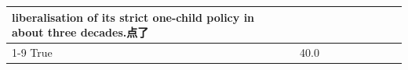 \begin{table}[H]
\begin{tabular}{lllrlllll}
liberalisation of its strict one-child policy in about three decades.点了 \\
\cline{1-9}
True & 40.0%
\end{tabular}
\end{table}
